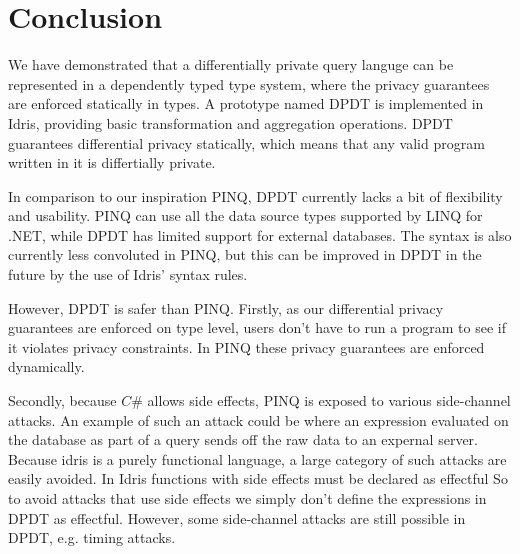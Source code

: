 \documentclass[12pt]{article}
\begin{document}

\section{Conclusion}\label{sec:conclusion}

We have demonstrated that a differentially private query languge can be represented in a dependently typed type system, where the privacy guarantees are enforced statically in types.
A prototype named DPDT is implemented in Idris, providing basic transformation and aggregation operations.
DPDT guarantees differential privacy statically, which means that any valid program written in it is differtially private.

In comparison to our inspiration PINQ, DPDT currently lacks a bit of flexibility and usability.
PINQ can use all the data source types supported by LINQ for .NET, while DPDT has limited support for external databases.
The syntax is also currently less convoluted in PINQ, but this can be improved in DPDT in the future by the use of Idris' syntax rules.

However, DPDT is safer than PINQ.
Firstly, as our differential privacy guarantees are enforced on type level, users don't have to run a program to see if it violates privacy constraints.
In PINQ these privacy guarantees are enforced dynamically.

Secondly, because $C\#$ allows side effects, PINQ is exposed to various side-channel attacks.
An example of such an attack could be where an expression evaluated on the database as part of a query sends off the raw data to an expernal server.
Because idris is a purely functional language, a large category of such attacks are easily avoided.
In Idris functions with side effects must be declared as effectful
So to avoid attacks that use side effects we simply don't define the expressions in DPDT as effectful.
However, some side-channel attacks are still possible in DPDT, e.g. timing attacks.



\end{document}
